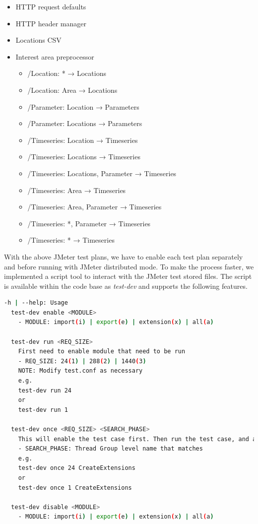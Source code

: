 \begin{itemize}
    \item HTTP request defaults
    \item HTTP header manager
    \item Locations CSV
    \item Interest area preprocessor
    \begin{itemize}
        \item /Location: * → Locations
    	\item /Location: Area → Locations
    	\item /Parameter: Location → Parameters
    	\item /Parameter: Locations → Parameters
    	\item /Timeseries: Location → Timeseries
    	\item /Timeseries: Locations → Timeseries
    	\item /Timeseries: Locations, Parameter → Timeseries
    	\item /Timeseries: Area → Timeseries
    	\item /Timeseries: Area, Parameter → Timeseries
    	\item /Timeseries: *, Parameter → Timeseries
    	\item /Timeseries: * → Timeseries
	\end{itemize}
\end{itemize}

With the above JMeter test plans, we have to enable each test plan separately and before running with JMeter distributed mode. To make the process faster, we implemented a script tool to interact with the JMeter test stored files. The script is available within the code base \cite{KarunarathneWDIASPlan} as \emph{test-dev} and supports the following features.

\begin{lstlisting}[language=sh, caption=Automated performance test plans.]
-h | --help: Usage
  test-dev enable <MODULE>
    - MODULE: import(i) | export(e) | extension(x) | all(a)

  test-dev run <REQ_SIZE>
    First need to enable module that need to be run
    - REQ_SIZE: 24(1) | 288(2) | 1440(3)
    NOTE: Modify test.conf as necessary
    e.g.
    test-dev run 24
    or
    test-dev run 1

  test-dev once <REQ_SIZE> <SEARCH_PHASE>
    This will enable the test case first. Then run the test case, and at the end disable and exit.
    - SEARCH_PHASE: Thread Group level name that matches
    e.g.
    test-dev once 24 CreateExtensions
    or
    test-dev once 1 CreateExtensions

  test-dev disable <MODULE>
    - MODULE: import(i) | export(e) | extension(x) | all(a)
\end{lstlisting}

